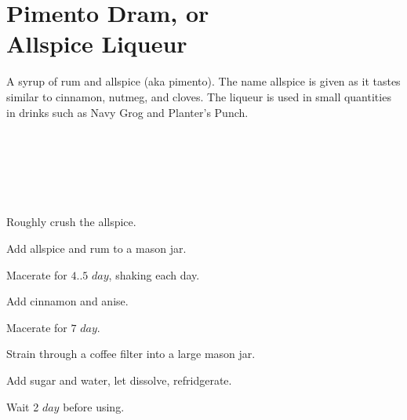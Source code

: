\section[Pimento Dram]{Pimento Dram, or\\Allspice Liqueur}

\begin{recipestats}[
        servings=24~\fluidounce,
        preptime=15~\minute,
        inactivetime=12~day,
        original=\citefield{allspiceDram}{shorttitle}~\cite{allspiceDram},
    ]
\end{recipestats}

\begin{recipeabstract}
    A syrup of rum and allspice (aka pimento).
    The name allspice is given as it tastes similar to cinnamon, nutmeg, and cloves.
    The liqueur is used in small quantities in drinks such as Navy Grog and Planter's Punch.
\end{recipeabstract}

\begin{ingredientcolumns}
    \begin{ingredientblock}
        \\
        \\
        \\
    \end{ingredientblock}
    \begin{ingredientblock}
        \\
    \end{ingredientblock}
\end{ingredientcolumns}

\begin{preparation}
\item Roughly crush the allspice.
\item Add allspice and rum to a mason jar.
\item Macerate for $4..5$ $day$, shaking each day.
\item Add cinnamon and anise.
\item Macerate for $7$ $day$.
\item Strain through a coffee filter into a large mason jar.
\item Add sugar and water, let dissolve, refridgerate.
\item Wait 2 $day$ before using.
\end{preparation}

\recipeend%
